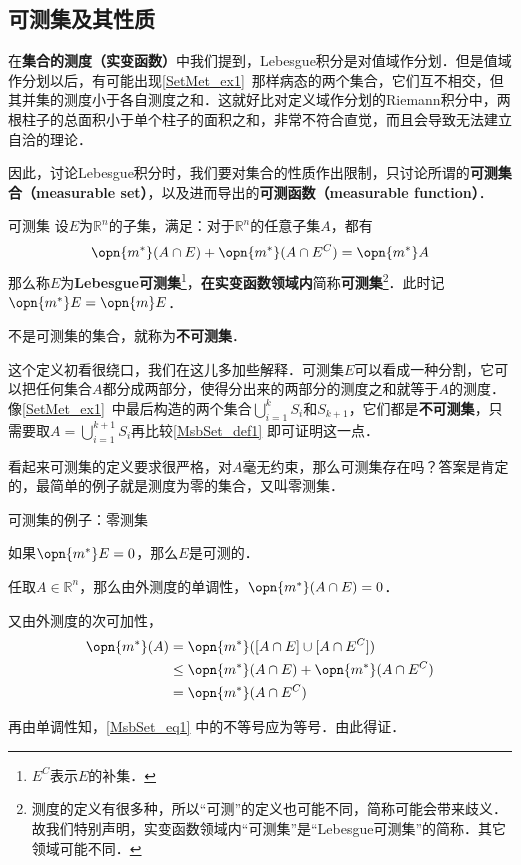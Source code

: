 

\subsection{可测集及其性质}

在\textbf{集合的测度（实变函数）}中我们提到，Lebesgue积分是对值域作分划．但是值域作分划以后，有可能出现\autoref{SetMet_ex1}~那样病态的两个集合，它们互不相交，但其并集的测度小于各自测度之和．这就好比对定义域作分划的Riemann积分中，两根柱子的总面积小于单个柱子的面积之和，非常不符合直觉，而且会导致无法建立自洽的理论．

因此，讨论Lebesgue积分时，我们要对集合的性质作出限制，只讨论所谓的\textbf{可测集合（measurable set）}，以及进而导出的\textbf{可测函数（measurable function）}．

\begin{definition}{可测集}\label{MsbSet_def1}
设$E$为$\mathbb{R}^n$的子集，满足：对于$\mathbb{R}^n$的任意子集$A$，都有
\begin{equation}
\opn{m^*}(A\cap E)+\opn{m^*}(A\cap E^C)=\opn{m^*}A
\end{equation}
那么称$E$为\textbf{Lebesgue可测集}\footnote{$E^C$表示$E$的补集．}，\textbf{在实变函数领域内}简称\textbf{可测集}\footnote{测度的定义有很多种，所以“可测”的定义也可能不同，简称可能会带来歧义．故我们特别声明，实变函数领域内“可测集”是“Lebesgue可测集”的简称．其它领域可能不同．}．此时记$\opn{m^*}E=\opn{m}E$．

不是可测集的集合，就称为\textbf{不可测集}．

\end{definition}

这个定义初看很绕口，我们在这儿多加些解释．可测集$E$可以看成一种分割，它可以把任何集合$A$都分成两部分，使得分出来的两部分的测度之和就等于$A$的测度．像\autoref{SetMet_ex1}~中最后构造的两个集合$\bigcup_{i=1}^k S_i$和$S_{k+1}$，它们都是\textbf{不可测集}，只需要取$A=\bigcup^{k+1}_{i=1} S_i$再比较\autoref{MsbSet_def1} 即可证明这一点．

看起来可测集的定义要求很严格，对$A$毫无约束，那么可测集存在吗？答案是肯定的，最简单的例子就是测度为零的集合，又叫零测集．

\begin{example}{可测集的例子：零测集}

如果$\opn{m^*}E=0$，那么$E$是可测的．

任取$A\in\mathbb{R}^n$，那么由外测度的单调性，$\opn{m^*}(A\cap E)=0$．

又由外测度的次可加性，
\begin{equation}\label{MsbSet_eq1}
\begin{aligned}
\opn{m^*}(A)&=\opn{m^*}([A\cap E]\cup[A\cap E^C])\\
&\leq \opn{m^*}(A\cap E)+\opn{m^*}(A\cap E^C)\\
&=\opn{m^*}(A\cap E^C)
\end{aligned}
\end{equation}

再由单调性知，\autoref{MsbSet_eq1} 中的不等号应为等号．由此得证．

\end{example}

